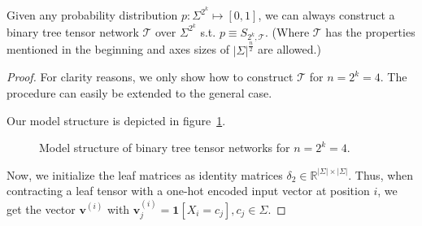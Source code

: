 \documentclass[../../main.tex]{subfiles}
\begin{document}
    \begin{theorem}
        \label{theorem:bttn_are_universal_approximators}
        Given any probability distribution $p: \Sigma^{2^k} \mapsto [0,1]$, we can always construct a binary tree tensor network $\mathcal{T}$ over $\Sigma^{2^k}$ s.t. $p \equiv S_{2^k, \mathcal{T}}$. (Where $\mathcal{T}$ has the properties mentioned in the beginning and axes sizes of $|\Sigma|^{\frac{n}{2}}$ are allowed.)
    \end{theorem}
    \vspace{-2.5em}
    \begin{proof}
        For clarity reasons, we only show how to construct $\mathcal{T}$ for $n = 2^k = 4$. The procedure can easily be extended to the general case.

        Our model structure is depicted in figure~\ref{fig:binary_tree_tensor_network_n_equals_four}.

        \begin{figure}[h]
        \centering
        \caption{Model structure of binary tree tensor networks for $n = 2^k = 4$.}
        \label{fig:binary_tree_tensor_network_n_equals_four}
    \end{figure}

    Now, we initialize the leaf matrices as identity matrices $\delta_2 \in \mathbb{R}^{|\Sigma| \times |\Sigma|}$. Thus, when contracting a leaf tensor with a one-hot encoded input vector at position $i$, we get the vector $\bm{v}^{(i)}$ with $\bm{v}^{(i)}_j = \bm{1}[X_i = c_j], c_j \in \Sigma$.


\end{proof}
\end{document}
